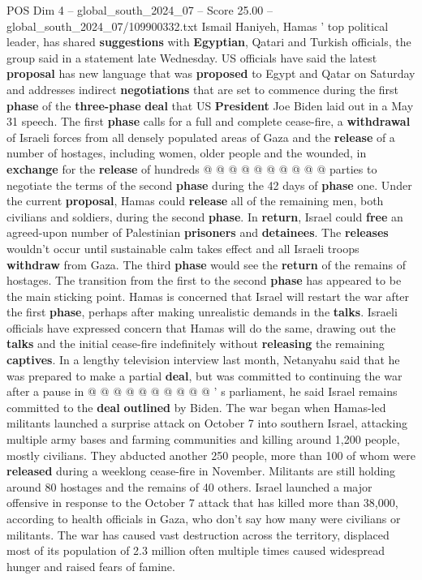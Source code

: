 \begin{textsample}{POS Dim 4 – global\_south\_2024\_07 – Score 25.00 – global\_south\_2024\_07/109900332.txt}
Ismail Haniyeh, Hamas ' top political leader, has shared \textbf{suggestions} with \textbf{Egyptian}, Qatari and Turkish officials, the group said in a statement late Wednesday.
US officials have said the latest \textbf{proposal} has new language that was \textbf{proposed} to Egypt and Qatar on Saturday and addresses indirect \textbf{negotiations} that are set to commence during the first \textbf{phase} of the \textbf{three-phase} \textbf{deal} that US \textbf{President} Joe Biden laid out in a May 31 speech.
The first \textbf{phase} calls for a full and complete cease-fire, a \textbf{withdrawal} of Israeli forces from all densely populated areas of Gaza and the \textbf{release} of a number of hostages, including women, older people and the wounded, in \textbf{exchange} for the \textbf{release} of hundreds @ @ @ @ @ @ @ @ @ @ parties to negotiate the terms of the second \textbf{phase} during the 42 days of \textbf{phase} one.
Under the current \textbf{proposal}, Hamas could \textbf{release} all of the remaining men, both civilians and soldiers, during the second \textbf{phase}.
In \textbf{return}, Israel could \textbf{free} an agreed-upon number of Palestinian \textbf{prisoners} and \textbf{detainees}.
The \textbf{releases} wouldn't occur until sustainable calm takes effect and all Israeli troops \textbf{withdraw} from Gaza.
The third \textbf{phase} would see the \textbf{return} of the remains of hostages.
The transition from the first to the second \textbf{phase} has appeared to be the main sticking point.
Hamas is concerned that Israel will restart the war after the first \textbf{phase}, perhaps after making unrealistic demands in the \textbf{talks}.
Israeli officials have expressed concern that Hamas will do the same, drawing out the \textbf{talks} and the initial cease-fire indefinitely without \textbf{releasing} the remaining \textbf{captives}.
In a lengthy television interview last month, Netanyahu said that he was prepared to make a partial \textbf{deal}, but was committed to continuing the war after a pause in @ @ @ @ @ @ @ @ @ @ ' s parliament, he said Israel remains committed to the \textbf{deal} \textbf{outlined} by Biden.
The war began when Hamas-led militants launched a surprise attack on October 7 into southern Israel, attacking multiple army bases and farming communities and killing around 1,200 people, mostly civilians.
They abducted another 250 people, more than 100 of whom were \textbf{released} during a weeklong cease-fire in November.
Militants are still holding around 80 hostages and the remains of 40 others.
Israel launched a major offensive in response to the October 7 attack that has killed more than 38,000, according to health officials in Gaza, who don't say how many were civilians or militants.
The war has caused vast destruction across the territory, displaced most of its population of 2.3 million often multiple times caused widespread hunger and raised fears of famine.

\end{textsample}

